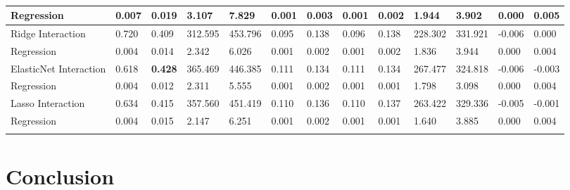 \documentclass{article}
\begin{document}
{\begin{longtable}[c]{|p{2.3cm}|ll|ll|ll|ll|ll|ll|}
  Regression & \multicolumn{1}{l|}{0.007} & 0.019 & \multicolumn{1}{l|}{3.107}   & 7.829   & \multicolumn{1}{l|}{0.001} & 0.003 & \multicolumn{1}{l|}{0.001} & 0.002 & \multicolumn{1}{l|}{1.944}   & 3.902   & \multicolumn{1}{l|}{0.000}  & 0.005  \\ \hline
  Ridge Interaction & \multicolumn{1}{l|}{0.720} & 0.409 & \multicolumn{1}{l|}{312.595} & 453.796 & \multicolumn{1}{l|}{0.095} & 0.138 & \multicolumn{1}{l|}{0.096} & 0.138 & \multicolumn{1}{l|}{228.302} & 331.921 & \multicolumn{1}{l|}{-0.006} & 0.000  \\
  Regression & \multicolumn{1}{l|}{0.004} & 0.014 & \multicolumn{1}{l|}{2.342}   & 6.026   & \multicolumn{1}{l|}{0.001} & 0.002 & \multicolumn{1}{l|}{0.001} & 0.002 & \multicolumn{1}{l|}{1.836}   & 3.944   & \multicolumn{1}{l|}{0.000}  & 0.004  \\ \hline
  ElasticNet Interaction & \multicolumn{1}{l|}{0.618} & \textbf{0.428} & \multicolumn{1}{l|}{365.469} & 446.385 & \multicolumn{1}{l|}{0.111} & 0.134 & \multicolumn{1}{l|}{0.111} & 0.134 & \multicolumn{1}{l|}{267.477} & 324.818 & \multicolumn{1}{l|}{-0.006} & -0.003 \\
  Regression & \multicolumn{1}{l|}{0.004} & 0.012 & \multicolumn{1}{l|}{2.311}   & 5.555   & \multicolumn{1}{l|}{0.001} & 0.002 & \multicolumn{1}{l|}{0.001} & 0.001 & \multicolumn{1}{l|}{1.798}   & 3.098   & \multicolumn{1}{l|}{0.000}  & 0.004  \\ \hline
  Lasso Interaction & \multicolumn{1}{l|}{0.634} & 0.415 & \multicolumn{1}{l|}{357.560} & 451.419 & \multicolumn{1}{l|}{0.110} & 0.136 & \multicolumn{1}{l|}{0.110} & 0.137 & \multicolumn{1}{l|}{263.422} & 329.336 & \multicolumn{1}{l|}{-0.005} & -0.001 \\
  Regression & \multicolumn{1}{l|}{0.004} & 0.015 & \multicolumn{1}{l|}{2.147}   & 6.251   & \multicolumn{1}{l|}{0.001} & 0.002 & \multicolumn{1}{l|}{0.001} & 0.001 & \multicolumn{1}{l|}{1.640}   & 3.885   & \multicolumn{1}{l|}{0.000}  & 0.004  \\ \hline
  \caption{}
  \label{tab:my-table}\\
  \end{longtable}}

  \section{Conclusion}


\printbibliography
\end{document}
